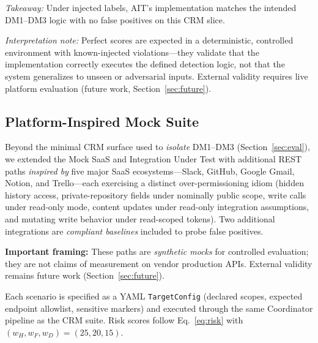 \documentclass[conference]{IEEEtran}
\begin{document}
\noindent\textit{Takeaway:} Under injected labels, AIT's implementation
matches the intended DM1--DM3 logic with no false positives on this CRM
slice.

\noindent\textit{Interpretation note:} Perfect scores are expected in
a deterministic, controlled environment with known-injected
violations---they validate that the implementation correctly executes
the defined detection logic, not that the system generalizes to
unseen or adversarial inputs. External validity requires live platform
evaluation (future work, Section~\ref{sec:future}).

\subsection{Platform-Inspired Mock Suite}
\label{sec:platformmock}

Beyond the minimal CRM surface used to \emph{isolate} DM1--DM3
(Section~\ref{sec:eval}), we extended the Mock SaaS and Integration
Under Test with additional REST paths \emph{inspired by} five major
SaaS ecosystems---Slack, GitHub, Google Gmail, Notion, and Trello---each
exercising a distinct over-permissioning idiom (hidden history access,
private-repository fields under nominally public scope, write calls
under read-only mode, content updates under read-only integration
assumptions, and mutating write behavior under read-scoped tokens).
Two additional integrations are \emph{compliant baselines} included
to probe false positives.

\noindent\textbf{Important framing:} These paths are \emph{synthetic
mocks} for controlled evaluation; they are not claims of measurement
on vendor production APIs. External validity remains future work
(Section~\ref{sec:future}).

Each scenario is specified as a YAML \texttt{TargetConfig} (declared
scopes, expected endpoint allowlist, sensitive markers) and executed
through the same Coordinator pipeline as the CRM suite. Risk scores
follow Eq.~\eqref{eq:risk} with $(w_H,w_F,w_D)=(25,20,15)$.
\end{document}
